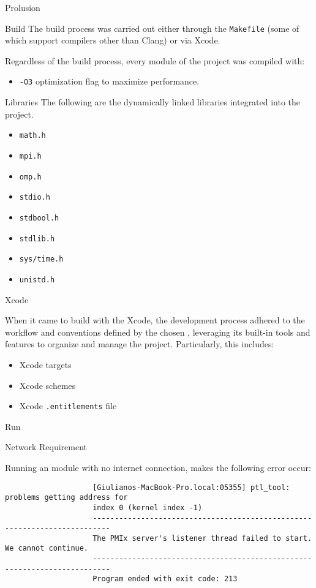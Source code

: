 \begin{chapter}{Prolusion}
\begin{section}{Build}
		The build process was carried out either through the \texttt{Makefile} (some of which support compilers other than Clang) or via Xcode.
		\par Regardless of the build process, every module of the project was compiled with:
		\begin{itemize}
			\item \texttt{-O3} optimization flag to maximize performance.
		\end{itemize}
		\begin{subsection}{Libraries}
			The following are the dynamically linked libraries integrated into the project.
			\begin{itemize}
				\item \texttt{math.h}
				\item \texttt{mpi.h}
				\item \texttt{omp.h}
				\item \texttt{stdio.h}
				\item \texttt{stdbool.h}
				\item \texttt{stdlib.h}
				\item \texttt{sys/time.h}
				\item \texttt{unistd.h}
			\end{itemize}
		\end{subsection}
		\begin{subsection}{Xcode}
			\par When it came to build with the Xcode, the development process adhered to the workflow and conventions defined by the chosen , leveraging its built-in tools and features to organize and manage the project. Particularly, this includes:
			\begin{itemize}
				\item Xcode targets
				\item Xcode schemes
				\item Xcode \texttt{.entitlements} file
			\end{itemize}
		\end{subsection}
	\end{section}
	\clearpage
	\begin{section}{Run}
		\begin{subsection}{Network Requirement}
			\par Running an  module with no internet connection, makes the following error occur:
			\begin{verbatim}
					[Giulianos-MacBook-Pro.local:05355] ptl_tool: problems getting address for
					index 0 (kernel index -1)
					--------------------------------------------------------------------------
					The PMIx server's listener thread failed to start. We cannot continue.
					--------------------------------------------------------------------------
					Program ended with exit code: 213
			\end{verbatim}
		\end{subsection}
	\end{section}
\end{chapter}